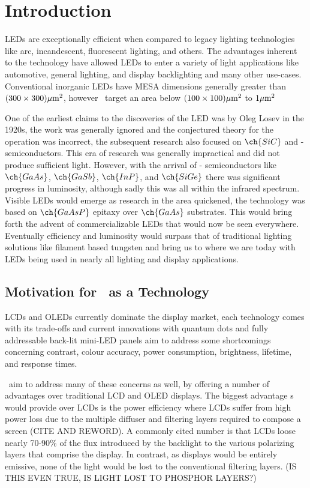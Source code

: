 \section{Introduction}

LEDs are exceptionally efficient when compared to legacy lighting technologies like arc, incandescent, fluorescent lighting, and others. The advantages inherent to the technology have allowed LEDs to enter a variety of light applications like automotive, general lighting, and display backlighting and many other use-cases. \cite{uLED_review}
Conventional inorganic LEDs have MESA dimensions generally greater than $(300\times 300) \umm$, however \uleds \ target an area below $(100\times 100) \umm$ to $1 \umm$ \cite{parbrook2021micro}

One of the earliest claims to the discoveries of the LED was by Oleg Losev in the 1920s, the work was generally ignored and the conjectured theory for the operation was incorrect, the subsequent research also focused on $\ch{SiC}$ and - semiconductors. This era of research was generally impractical and did not produce sufficient light. However, with the arrival of - semiconductors like $\ch{GaAs}$, $\ch{GaSb}$, $\ch{InP}$, and $\ch{SiGe}$ there was significant progress in luminosity, although sadly this was all within the infrared spectrum.
Visible LEDs would emerge as research in the area quickened, the technology was based on $\ch{GaAsP}$ epitaxy over $\ch{GaAs}$ substrates. This would bring forth the advent of commercializable LEDs that would now be seen everywhere. Eventually efficiency and luminosity would surpass that of traditional lighting solutions like filament based tungsten and bring us to where we are today with LEDs being used in nearly all lighting and display applications.




\subsection{Motivation for \uleds \ as a Technology}
LCDs and OLEDs currently dominate the display market, each technology comes with its trade-offs and current innovations with quantum dots and fully addressable back-lit mini-LED panels aim to address some shortcomings concerning contrast, colour accuracy, power consumption, brightness, lifetime, and response times.

\uleds \ aim to address many of these concerns as well, by offering a number of advantages over traditional LCD and OLED displays. The biggest advantage \uled s would provide over LCDs is the power efficiency where LCDs suffer from high power loss due to the multiple diffuser and filtering layers required to compose a screen (CITE AND REWORD). A commonly cited number is that LCDs loose nearly 70-90\% of the flux introduced by the backlight to the various polarizing layers that comprise the display. In contrast, as \uled  displays would be entirely emissive, none of the light would be lost to the conventional filtering layers. (IS THIS EVEN TRUE, IS LIGHT LOST TO PHOSPHOR LAYERS?)


